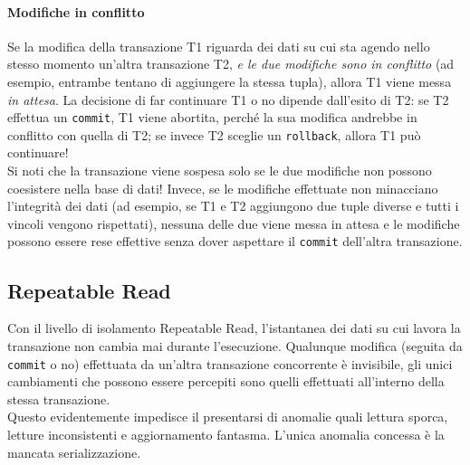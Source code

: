 \documentclass[12pt,a4paper]{book}
\begin{document}
	\paragraph{Modifiche in conflitto} Se la modifica della transazione T1 riguarda dei dati su cui sta agendo nello stesso momento un'altra transazione T2, \textit{e le due modifiche sono in conflitto} (ad esempio, entrambe tentano di aggiungere la stessa tupla), allora T1 viene messa \textit{in attesa}. La decisione di far continuare T1 o no dipende dall'esito di T2: se T2 effettua un \texttt{commit}, T1 viene abortita, perché la sua modifica andrebbe in conflitto con quella di T2; se invece T2 sceglie un \texttt{rollback}, allora T1 può continuare!\\ 
	Si noti che la transazione viene sospesa solo se le due modifiche non possono coesistere nella base di dati! Invece, se le modifiche effettuate non minacciano l'integrità dei dati (ad esempio, se T1 e T2 aggiungono due tuple diverse e tutti i vincoli vengono rispettati), nessuna delle due viene messa in attesa e le modifiche possono essere rese effettive senza dover aspettare il \texttt{commit} dell'altra transazione.
	\subsection{Repeatable Read}
	Con il livello di isolamento Repeatable Read, l'istantanea dei dati su cui lavora la transazione non cambia mai durante l'esecuzione. Qualunque modifica (seguita da \texttt{commit} o no) effettuata da un'altra transazione concorrente è invisibile, gli unici cambiamenti che possono essere percepiti sono quelli effettuati all'interno della stessa transazione.\\
	Questo evidentemente impedisce il presentarsi di anomalie quali lettura sporca, letture inconsistenti e aggiornamento fantasma. L'unica anomalia concessa è la mancata serializzazione.
\end{document}
